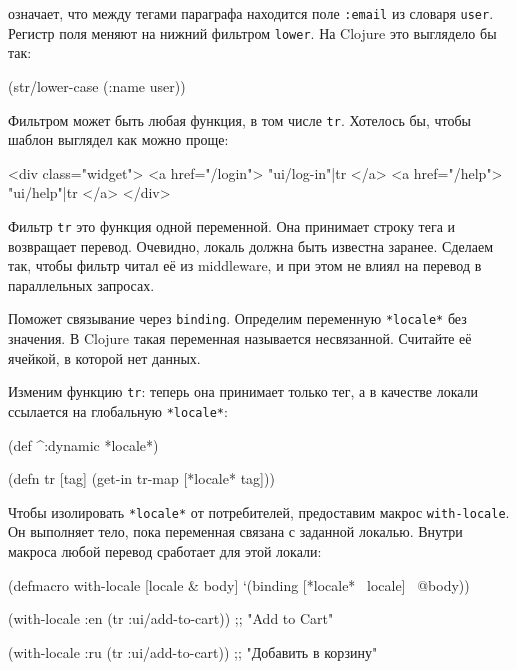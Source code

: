 \noindent
означает, что между тегами параграфа находится поле \verb|:email| из словаря
\verb|user|. Регистр поля меняют на нижний фильтром \verb|lower|. На Clojure
это выглядело бы так:

\begin{english}
  \begin{clojure}
(str/lower-case (:name user))
  \end{clojure}
\end{english}

Фильтром может быть любая функция, в том числе \verb|tr|. Хотелось бы,
чтобы шаблон выглядел как можно проще:

\begin{english}
  \begin{htmldjango}
<div class="widget">
  <a href="/login">{{ "ui/log-in"|tr }}</a>
  <a href="/help">{{ "ui/help"|tr }}</a>
</div>
  \end{htmldjango}
\end{english}

Фильтр \verb|tr| это функция одной переменной. Она принимает строку тега и
возвращает перевод. Очевидно, локаль должна быть известна заранее. Сделаем так,
чтобы фильтр читал её из middleware, и при этом не влиял на перевод в параллельных
запросах.

Поможет связывание через \verb|binding|. Определим переменную
\verb|*locale*| без значения. В Clojure такая переменная называется
несвязанной. Считайте её ячейкой, в которой нет данных.

Изменим функцию \verb|tr|: теперь она принимает только тег, а в качестве
локали ссылается на глобальную \verb|*locale*|:

\begin{english}
  \begin{clojure}
(def ^:dynamic *locale*)

(defn tr [tag]
  (get-in tr-map [*locale* tag]))
  \end{clojure}
\end{english}


Чтобы изолировать \verb|*locale*| от потребителей, предоставим макрос
\verb|with-locale|. Он выполняет тело, пока переменная связана с заданной
локалью. Внутри макроса любой перевод сработает для этой локали:

  \begin{clojure}
(defmacro with-locale
  [locale & body]
  `(binding [*locale* ~locale]
     ~@body))

(with-locale :en
  (tr :ui/add-to-cart))
;; "Add to Cart"

(with-locale :ru
  (tr :ui/add-to-cart))
;; "Добавить в корзину"
  \end{clojure}

